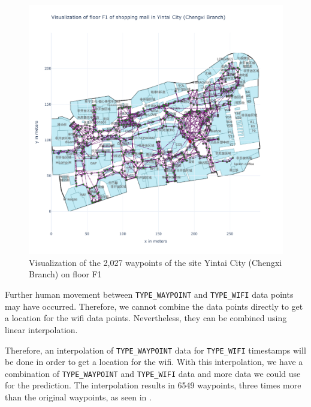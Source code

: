 \begin{figure}[h!]
    \centering
    \includegraphics[scale=0.375]{images/whole_floor_visualization_wo_interpolated.pdf}
    \caption{Visualization of the 2,027 waypoints of the site Yintai City (Chengxi Branch) on floor F1}
    \label{fig:vis-wo-interpolated}
\end{figure}

Further human movement between \texttt{TYPE\_WAYPOINT} and \texttt{TYPE\_WIFI} data points may have occurred.
Therefore, we cannot combine the data points directly to get a location for the \ac{wifi} data points.
Nevertheless, they can be combined using linear interpolation.%

%     

Therefore, an interpolation of \texttt{TYPE\_WAYPOINT} data for \texttt{TYPE\_WIFI} timestamps will be done in order to get a location for the \ac{wifi}.
With this interpolation, we have a combination of \texttt{TYPE\_WAYPOINT} and \texttt{TYPE\_WIFI} data and more data we could use for the prediction.
The interpolation results in 6549 waypoints, three times more than the original waypoints, as seen in .

